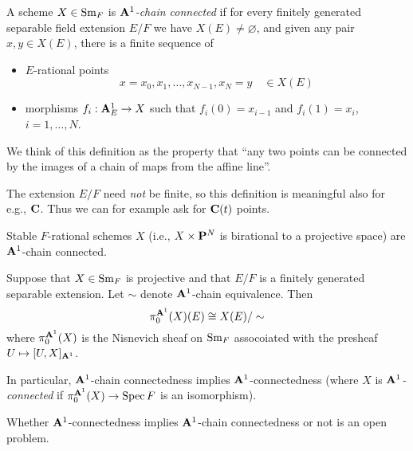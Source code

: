 \begin{definition}
A scheme $X\in\mathrm{Sm}_F$ is \emph{$\mathbf{A}^1$-chain connected} if for every finitely generated separable field extension $E/F$ we have $X(E)\ne\varnothing$, and given any pair $x,y\in X(E)$, there is a finite sequence of
\begin{itemize}
\item $E$-rational points 
\[
x=x_0,x_1,\dots,x_{N-1},x_N=y \quad\in X(E)
\]
\item morphisms $f_i:\mathbf{A}^1_E\to X$ such that $f_i(0)=x_{i-1}$ and $f_i(1)=x_i$, $i=1,\dots,N$.
\end{itemize}
\end{definition}
We think of this definition as the property that ``any two points can be connected by the images of a chain of maps from the affine line''.

\begin{remark}
The extension $E/F$ need \emph{not} be finite, so this definition is meaningful also for e.g., $\mathbf{C}$. Thus we can for example ask for $\mathbf{C}(t)$ points. 
\end{remark}

\begin{example}
Stable $F$-rational schemes $X$ (i.e., $X\times\mathbf{P}^N$ is birational to a projective space) are $\mathbf{A}^1$-chain connected.
\end{example}

\begin{theorem}
Suppose that $X\in\mathrm{Sm}_F$ is projective and that $E/F$ is a finitely generated separable extension. Let $\sim$ denote $\mathbf{A}^1$-chain equivalence. Then 
\[
\pi_0^{\mathbf{A}^1}(X)(E)\cong X(E)/\sim
\]where $\pi_0^{\mathbf{A}^1}(X)$ is the Nisnevich sheaf on $\mathrm{Sm}_F$ assocoiated with the presheaf $U\mapsto [U,X]_{\mathbf{A}^1}$.

In particular, $\mathbf{A}^1$-chain connectedness implies $\mathbf{A}^1$-connectedness (where $X$ is \emph{$\mathbf{A}^1$-connected} if $\pi_0^{\mathbf{A}^1}(X)\to\operatorname{Spec} F$ is an isomorphism).
\end{theorem}

\begin{remark}
Whether $\mathbf{A}^1$-connectedness implies $\mathbf{A}^1$-chain connectedness or not is an open problem.
\end{remark}

